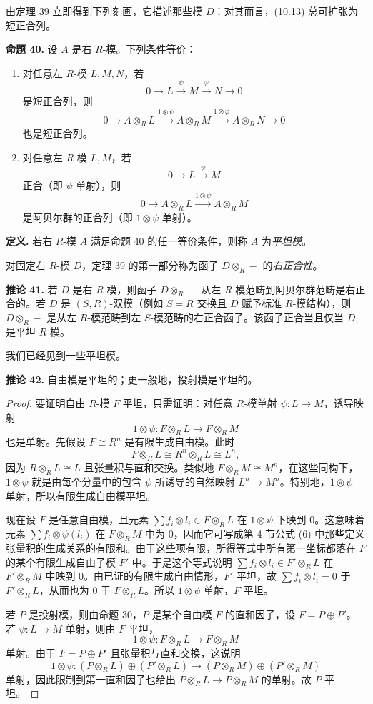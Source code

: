 由定理 39 立即得到下列刻画，它描述那些模 $D$：对其而言，(10.13) 总可扩张为短正合列。

\noindent\textbf{命题 40.} 设 $A$ 是右 $R$-模。下列条件等价：
\begin{enumerate}[label=(\arabic*)]
\item 对任意左 $R$-模 $L,M,N$，若
\[
0\longrightarrow L\xrightarrow{\psi}M\xrightarrow{\varphi}N\longrightarrow0
\]
是短正合列，则
\[
0\longrightarrow A\otimes_RL\xrightarrow{1\otimes\psi}A\otimes_RM\xrightarrow{1\otimes\varphi}A\otimes_RN\longrightarrow0
\]
也是短正合列。
\item 对任意左 $R$-模 $L,M$，若
\[
0\longrightarrow L\xrightarrow{\psi}M
\]
正合（即 $\psi$ 单射），则
\[
0\longrightarrow A\otimes_RL\xrightarrow{1\otimes\psi}A\otimes_RM
\]
是阿贝尔群的正合列（即 $1\otimes\psi$ 单射）。
\end{enumerate}

\noindent\textbf{定义.} 若右 $R$-模 $A$ 满足命题 40 的任一等价条件，则称 $A$ 为\emph{平坦模}。

对固定右 $R$-模 $D$，定理 39 的第一部分称为函子 $D\otimes_R-$ 的\emph{右正合性}。

\noindent\textbf{推论 41.} 若 $D$ 是右 $R$-模，则函子 $D\otimes_R-$ 从左 $R$-模范畴到阿贝尔群范畴是右正合的。若 $D$ 是 $(S,R)$-双模（例如 $S=R$ 交换且 $D$ 赋予标准 $R$-模结构），则 $D\otimes_R-$ 是从左 $R$-模范畴到左 $S$-模范畴的右正合函子。该函子正合当且仅当 $D$ 是平坦 $R$-模。

我们已经见到一些平坦模。

\noindent\textbf{推论 42.} 自由模是平坦的；更一般地，投射模是平坦的。

\begin{proof}
要证明自由 $R$-模 $F$ 平坦，只需证明：对任意 $R$-模单射 $\psi:L\to M$，诱导映射
\[
1\otimes\psi:F\otimes_RL\longrightarrow F\otimes_RM
\]
也是单射。先假设 $F\cong R^n$ 是有限生成自由模。此时
\[
F\otimes_RL\cong R^n\otimes_RL\cong L^n,
\]
因为 $R\otimes_RL\cong L$ 且张量积与直和交换。类似地 $F\otimes_RM\cong M^n$，在这些同构下，$1\otimes\psi$ 就是由每个分量中的包含 $\psi$ 所诱导的自然映射 $L^n\to M^n$。特别地，$1\otimes\psi$ 单射，所以有限生成自由模平坦。

现在设 $F$ 是任意自由模，且元素 $\sum f_i\otimes l_i\in F\otimes_RL$ 在 $1\otimes\psi$ 下映到 $0$。这意味着元素 $\sum f_i\otimes\psi(l_i)$ 在 $F\otimes_RM$ 中为 $0$，因而它可写成第 4 节公式 (6) 中那些定义张量积的生成关系的有限和。由于这些项有限，所得等式中所有第一坐标都落在 $F$ 的某个有限生成自由子模 $F'$ 中。于是这个等式说明 $\sum f_i\otimes l_i\in F'\otimes_RL$ 在 $F'\otimes_RM$ 中映到 $0$。由已证的有限生成自由情形，$F'$ 平坦，故 $\sum f_i\otimes l_i=0$ 于 $F'\otimes_RL$，从而也为 $0$ 于 $F\otimes_RL$。所以 $1\otimes\psi$ 单射，$F$ 平坦。

若 $P$ 是投射模，则由命题 30，$P$ 是某个自由模 $F$ 的直和因子，设 $F=P\oplus P'$。若 $\psi:L\to M$ 单射，则由 $F$ 平坦，
\[
1\otimes\psi:F\otimes_RL\longrightarrow F\otimes_RM
\]
单射。由于 $F=P\oplus P'$ 且张量积与直和交换，这说明
\[
1\otimes\psi:(P\otimes_RL)\oplus(P'\otimes_RL)
\longrightarrow (P\otimes_RM)\oplus(P'\otimes_RM)
\]
单射，因此限制到第一直和因子也给出 $P\otimes_RL\to P\otimes_RM$ 的单射。故 $P$ 平坦。
\end{proof}

